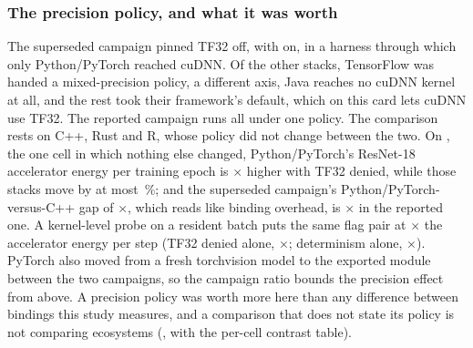 \subsubsection{The precision policy, and what it was worth}
\label{sec:tf32}

The superseded campaign pinned TF32 off, with  on, in
a harness through which only Python/PyTorch reached cuDNN. Of the other stacks,
TensorFlow was handed a mixed-precision policy, a different axis, Java reaches
no cuDNN kernel at all, and the rest took their framework's default, which on
this card lets cuDNN use TF32. The reported campaign runs all \vEcosystems{}
under one policy. The comparison rests on C++, Rust and R, whose policy did not
change between the two. On \vPrecisionGapDataset{}, the one cell in which
nothing else changed, Python/PyTorch's ResNet-18 accelerator energy per training
epoch is \vPrecisionPytorchRatioMin$\times$ higher with TF32 denied, while those
\vPrecisionControlStacks{} stacks move by at most \vPrecisionOthersMaxChangePct\,\%;
and the superseded campaign's Python/PyTorch-versus-C++ gap of
\vPrecisionGapBefore$\times$, which reads like binding overhead, is
\vPrecisionGapAfter$\times$ in the reported one. A kernel-level probe on a resident batch puts the
same flag pair at \vPrecisionKernelDetEnergyRatio$\times$ the accelerator energy
per step (TF32 denied alone, \vPrecisionKernelEnergyRatio$\times$; determinism
alone, \vPrecisionKernelDetOnlyRatio$\times$). PyTorch also moved from a fresh
torchvision model to the exported module between the two campaigns, so the
campaign ratio bounds the precision effect from above. A precision policy was
worth more here than any difference between bindings this study measures, and a
comparison that does not state its policy is not comparing ecosystems
(, with the per-cell contrast table).


